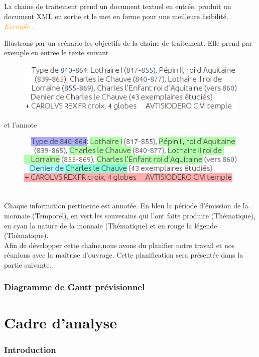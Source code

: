 \documentclass[a4paper, 11pt]{report}
\newenvironment{exemple}
    {
    \textit{\textcolor{orange}{
    Exemple : \\}}
    }
    {\\
    }
\begin{document}
	La chaine de traitement prend un document textuel en entrée, produit un document XML en sortie et le met en forme pour une meilleure lisibilité.\\
	\begin{exemple}
Illustrons par un scénario les objectifs de la chaine de traitement.
Elle prend par exemple en entrée le texte suivant

\begin{figure}[h!]
\centering
\includegraphics[scale=.5]{img/exemple_text.png}
\end{figure}

et l'annote
\end{exemple}
\begin{figure}[h!]
\centering
\includegraphics[scale=.5]{img/exemple_text_ann.png} 
\end{figure}\\
Chaque information pertinente est annotée. En bleu la période d'émission de la monnaie (Temporel), en vert les souverains qui l'ont faite produire (Thématique), en cyan la nature de la monnaie (Thématique) et en rouge la légende (Thématique).\\
Afin de développer cette chaîne,nous avons du planifier notre travail et nos réunions avec la maîtrise d'ouvrage. Cette planification sera présentée dans la partie suivante.

	\section{Diagramme de Gantt prévisionnel}
	
\part{Cadre d'analyse}
	\section*{Introduction}
	
\end{document}
